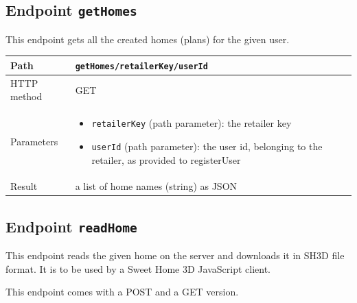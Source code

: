 \documentclass[a4paper]{report}
\begin{document}
\subsection{Endpoint \texttt{getHomes}}

This endpoint gets all the created homes (plans) for the given user.

\begin{center}
\begin{tabularx} {\textwidth} { | l | X | }

\hline

Path & \texttt{getHomes/retailerKey/userId} \\

\hline

HTTP method & GET \\

\hline

Parameters & \begin{itemize}[leftmargin=*,noitemsep,topsep=0px]
\item \texttt{retailerKey} (path parameter): the retailer key
\item \texttt{userId} (path parameter): the user id, belonging to the retailer, as provided to registerUser 
\end{itemize} \\

\hline

Result & a list of home names (string) as JSON \\

\hline

\end{tabularx}
\end{center}


\subsection{Endpoint \texttt{readHome}}

This endpoint reads the given home on the server and downloads it in SH3D file format. It is to be used by a Sweet Home 3D JavaScript client.

This endpoint comes with a POST and a GET version.
\end{document}
